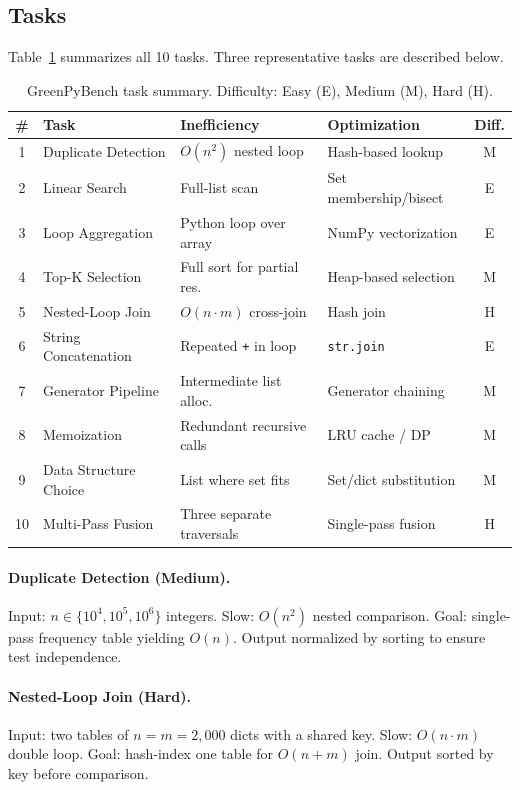 \documentclass{article}
\begin{document}
\subsection{Tasks}
Table~\ref{tab:tasks} summarizes all 10 tasks. Three representative tasks are described below.

\begin{table}[h]
\centering
\caption{GreenPyBench task summary. Difficulty: Easy (E), Medium (M), Hard (H).}
\label{tab:tasks}
\small
\begin{tabular}{clllc}
\toprule
\textbf{\#} & \textbf{Task} & \textbf{Inefficiency} & \textbf{Optimization} & \textbf{Diff.} \\
\midrule
1  & Duplicate Detection   & $O(n^2)$ nested loop       & Hash-based lookup      & M \\
2  & Linear Search         & Full-list scan             & Set membership/bisect  & E \\
3  & Loop Aggregation      & Python loop over array     & NumPy vectorization    & E \\
4  & Top-K Selection       & Full sort for partial res. & Heap-based selection   & M \\
5  & Nested-Loop Join      & $O(n \cdot m)$ cross-join  & Hash join              & H \\
6  & String Concatenation  & Repeated \texttt{+} in loop & \texttt{str.join}     & E \\
7  & Generator Pipeline    & Intermediate list alloc.   & Generator chaining     & M \\
8  & Memoization           & Redundant recursive calls  & LRU cache / DP         & M \\
9  & Data Structure Choice & List where set fits        & Set/dict substitution  & M \\
10 & Multi-Pass Fusion     & Three separate traversals  & Single-pass fusion     & H \\
\bottomrule
\end{tabular}
\end{table}

\paragraph{Duplicate Detection (Medium).} Input: $n \in \{10^4,10^5,10^6\}$ integers. Slow: $O(n^2)$ nested comparison. Goal: single-pass frequency table yielding $O(n)$. Output normalized by sorting to ensure test independence.

\paragraph{Nested-Loop Join (Hard).} Input: two tables of $n\!=\!m\!=\!2{,}000$ dicts with a shared key. Slow: $O(n \cdot m)$ double loop. Goal: hash-index one table for $O(n+m)$ join. Output sorted by key before comparison.
\end{document}
